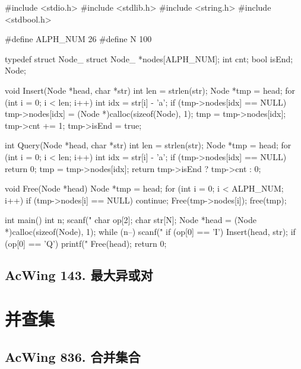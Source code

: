 \begin{mycpptwocol}[链表形式的Trie]
#include <stdio.h>
#include <stdlib.h>
#include <string.h>
#include <stdbool.h>

#define ALPH_NUM 26
#define N 100

typedef struct Node_ {
    struct Node_ *nodes[ALPH_NUM];
    int cnt;
    bool isEnd;
} Node;

void Insert(Node *head, char *str)
{
    int len = strlen(str);
    Node *tmp = head;
    for (int i = 0; i < len; i++) {
        int idx = str[i] - 'a';
        if (tmp->nodes[idx] == NULL) {
            tmp->nodes[idx] = (Node *)calloc(sizeof(Node), 1);
        }
        tmp = tmp->nodes[idx];
    }
    tmp->cnt += 1;
    tmp->isEnd = true;
}

int Query(Node *head, char *str)
{
    int len = strlen(str);
    Node *tmp = head;
    for (int i = 0; i < len; i++) {
        int idx = str[i] - 'a';
        if (tmp->nodes[idx] == NULL) {
            return 0;
        }
        tmp = tmp->nodes[idx];
    }
    return tmp->isEnd ? tmp->cnt : 0;
}

void Free(Node *head) {
    Node *tmp = head;
    for (int i = 0; i < ALPH_NUM; i++) {
        if (tmp->nodes[i] == NULL) {
            continue;
        }
        Free(tmp->nodes[i]);
    }
    free(tmp);
}

int main()
{
    int n;
    scanf("%
    char op[2];
    char str[N];
    Node *head = (Node *)calloc(sizeof(Node), 1);
    while (n--) {
        scanf("%
        if (op[0] == 'I') {
            Insert(head, str);
        }
        if (op[0] == 'Q') {
            printf("%
        }
    }
    Free(head);
    return 0;
}
\end{mycpptwocol}

\begin{mycpptwocol}[数组模拟Trie]

\end{mycpptwocol}

\subsection{AcWing 143. 最大异或对}

\section{并查集}
\subsection{AcWing 836. 合并集合}

